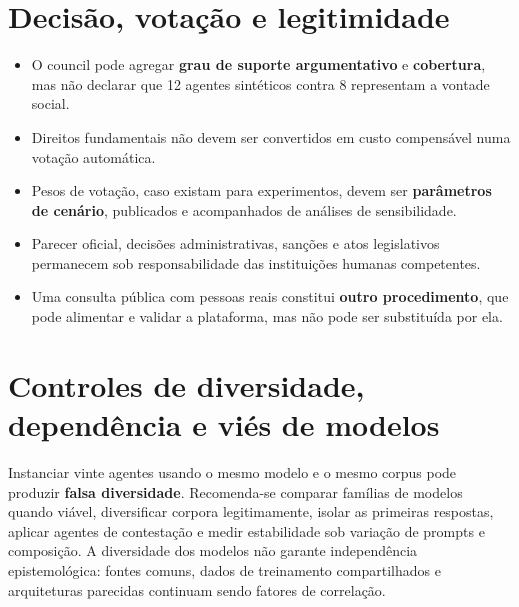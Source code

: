 \documentclass[12pt,a4paper,oneside,english,brazil]{abntex2}
\begin{document}
\section{Decisão, votação e legitimidade}
\begin{itemize}
\item O council pode agregar \textbf{grau de suporte argumentativo} e \textbf{cobertura}, mas não declarar que 12 agentes sintéticos contra 8 representam a vontade social.
\item Direitos fundamentais não devem ser convertidos em custo compensável numa votação automática.
\item Pesos de votação, caso existam para experimentos, devem ser \textbf{parâmetros de cenário}, publicados e acompanhados de análises de sensibilidade.
\item Parecer oficial, decisões administrativas, sanções e atos legislativos permanecem sob responsabilidade das instituições humanas competentes.
\item Uma consulta pública com pessoas reais constitui \textbf{outro procedimento}, que pode alimentar e validar a plataforma, mas não pode ser substituída por ela.
\end{itemize}

\section{Controles de diversidade, dependência e viés de modelos}
Instanciar vinte agentes usando o mesmo modelo e o mesmo corpus pode produzir \textbf{falsa diversidade}. Recomenda-se comparar famílias de modelos quando viável, diversificar corpora legitimamente, isolar as primeiras respostas, aplicar agentes de contestação e medir estabilidade sob variação de prompts e composição. A diversidade dos modelos não garante independência epistemológica: fontes comuns, dados de treinamento compartilhados e arquiteturas parecidas continuam sendo fatores de correlação.
\end{document}
